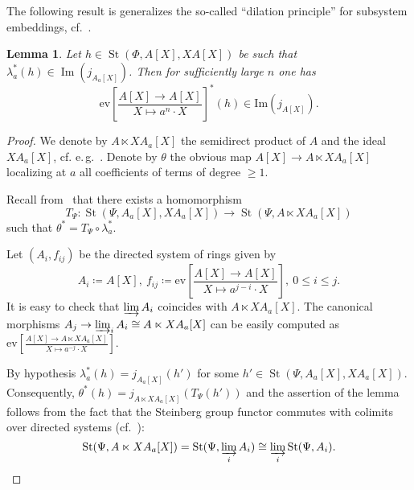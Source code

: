 \documentclass[oneside, 10pt]{amsart}
\DeclareMathOperator{\St}{St}
\DeclareMathOperator{\Img}{Im}
\newcommand{\eval}[4]{\mathrm{ev} \textstyle \left[\frac{#2[#1] \rightarrow #3}{#1 \mapsto #4}\right]}
\newcommand{\ev}[3]{\eval{X}{#1}{#2}{#3}}
\numberwithin{equation}{section}
\numberwithin{thm}{section}
\newtheorem{lemma}[thm]{Lemma}
\numberwithin{lemma}{section}
\theoremstyle{definition}
\theoremstyle{remark}
\begin{document}
The following result is generalizes the so-called ``dilation principle'' for subsystem embeddings, cf.~\cite[Corollary~2.4]{Tu83}.
\begin{lemma}\label{lem:dp-2}
Let $h\in\St(\Phi, A[X], X A[X])$ be such that $\lambda_a^*(h) \in \Img(j_{A_a[X]})$.
Then for sufficiently large $n$ one has
\[\ev{A}{A[X]}{a^n\cdot X}^*(h) \in \mathrm{Im}(j_{A[X]}).\]
\end{lemma}
\begin{proof}
We denote by $A\ltimes XA_a[X]$ the semidirect product of $A$ and the ideal $XA_a[X]$, cf. e.\,g.~\cite[Definition~3.2]{S15}.
Denote by $\theta$ the obvious map $A[X]\rightarrow A\ltimes XA_a[X]$ localizing at $a$ all coefficients of terms of degree $\geq 1$.

Recall from~\cite[\S~2]{LS17} that there exists a homomorphism
\[T_\Psi \colon \St(\Psi, A_a[X], XA_a[X]) \to \St(\Psi, A \ltimes XA_a[X])\]
such that $\theta^* = T_\Psi \circ \lambda_a^*$.

Let $(A_i, f_{ij})$ be the directed system of rings given by
\[A_i\coloneqq A[X],\ f_{ij} \coloneqq \ev{A}{A[X]}{a^{j-i} \cdot X},\ 0 \leq i\leq j.\]
It is easy to check that $\varinjlim A_i$ coincides with $A \ltimes XA_a[X]$.
The canonical morphisms $A_j\rightarrow \varinjlim_i A_i \cong A \ltimes XA_a[X]$ can be easily computed as $\ev{A}{A\ltimes XA_a[X]}{a^{-j} \cdot X}$.

By hypothesis $\lambda_a^*(h) = j_{A_a[X]}(h')$ for some $h' \in \St(\Psi, A_a[X], XA_a[X])$.
Consequently, $\theta^*(h) = j_{A \ltimes XA_a[X]}(T_\Psi(h'))$
and the assertion of the lemma follows from the fact that the Steinberg group functor commutes with
colimits over directed systems (cf.~\cite[Lemma~2.2]{Tu83}):
\[\St(\Psi, A\ltimes XA_a[X]) = \St(\Psi, \varinjlim_i A_i) \cong \varinjlim_i \St(\Psi,A_i). \qedhere\]
\end{proof}
\end{document}
